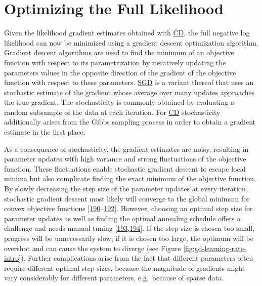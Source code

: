 \documentclass[11pt,a4paper,twoside]{book}
\theoremstyle{definition}
\theoremstyle{definition}
\theoremstyle{remark}
\begin{document}
\section{Optimizing the Full
Likelihood}\label{full-likelihood-optimization}

Given the likelihood gradient estimates obtained with
\protect\hyperlink{abbrev}{CD}, the full negative log likelihood can now
be minimized using a gradient descent optimization algorithm. Gradient
descent algorithms are used to find the minimum of an objective function
with respect to its parametrization by iteratively updating the
parameters values in the opposite direction of the gradient of the
objective function with respect to these parameters.
\protect\hyperlink{abbrev}{SGD} is a variant thereof that uses an
stochastic estimate of the gradient whose average over many updates
approaches the true gradient. The stochasticity is commonly obtained by
evaluating a random subsample of the data at each iteration. For
\protect\hyperlink{abbrev}{CD} stochasticity additionally arises from
the Gibbs sampling process in order to obtain a gradient estimate in the
first place.

As a consequence of stochasticity, the gradient estimates are noisy,
resulting in parameter updates with high variance and strong
fluctuations of the objective function. These fluctuations enable
stochastic gradient descent to escape local minima but also complicate
finding the exact minimum of the objective function. By slowly
decreasing the step size of the parameter updates at every iteration,
stochastic gradient descent most likely will converge to the global
minimum for convex objective functions
{[}\protect\hyperlink{ref-Ruder2017}{190}--\protect\hyperlink{ref-Bottou2010}{192}{]}.
However, choosing an optimal step size for parameter updates as well as
finding the optimal annealing schedule offers a challenge and needs
manual tuning
{[}\protect\hyperlink{ref-Schaul2013}{193},\protect\hyperlink{ref-Zeiler2012}{194}{]}.
If the step size is chosen too small, progress will be unnecessarily
slow, if it is chosen too large, the optimum will be overshot and can
cause the system to diverge (see Figure
\ref{fig:gd-learning-rate-intro}). Further complications arise from the
fact that different parameters often require different optimal step
sizes, because the magnitude of gradients might vary considerably for
different parameters, e.g.~because of sparse data.
\end{document}
